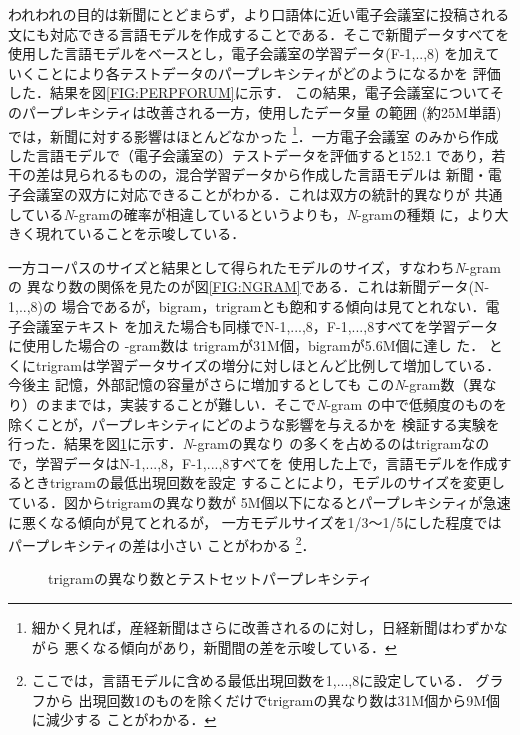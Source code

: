 \par
  われわれの目的は新聞にとどまらず，より口語体に近い電子会議室に投稿される
文にも対\mbox{応できる言語モデルを作成することである．}そこで新聞データすべてを
使用した言語モデルをベースとし，電子会議室の学習データ(F-1,..,8)
を加えていくことにより各テストデータのパープレキシティがどのようになるかを
評価した．結果を図\ref{FIG:PERPFORUM}に示す．
\mbox{この結果，電子会議室につい}\mbox{てそのパープレキシティは改善される一方，}使用したデータ量
の範囲 (約25M単語)では，新聞に対する影響はほとんどなかった
\footnote{細かく見れば，産経新聞はさらに改善されるのに対し，日経新聞はわずかながら
悪くなる傾向があり，新聞間の差を示唆している．}．一方電子会議室
\mbox{のみから作成した言語モデルで（電子会議}室の）テストデータを評価すると152.1
\mbox{であり，若干の差は見られるものの，混合学習データか}ら作成した言語モデルは
新聞・電子会議室の双方に対応できることがわかる．これは双方の統計的異なりが
共通している{\it N}-gramの確率が相違しているというよりも，{\it N}-gramの種類
に，より大きく現れていることを示唆している．
\par
一方コーパスのサイズと結果として得られたモデルのサイズ，すなわち{\it N}-gramの
異なり数\mbox{の関係を見たのが図\ref{FIG:NGRAM}である．}これは新聞データ(N-1,..,8)の
場合であるが，bigram，trigramとも飽和する傾向は見てとれない．電子会議室テキスト
を加えた場合も同様でN-1,...,8，F-1,...,8すべてを学習データに使用した場合の
\hspace{-0.1mm}{\it N}-gram\hspace{-0.1mm}数は
\hspace{-0.1mm}trigram\hspace{-0.1mm}が31M個，bigramが5.6M個に達し\break
た．
とくにtrigramは学習データサイズの増分に対しほとんど比例して増加している．
今後主\break
記憶，外部記憶の容量がさらに増加するとしても
この{\it N}-gram数（異なり）のままでは，実装することが難しい．そこで{\it N}-gram
の中で低頻度のものを除くことが，パープレキシティにどのような影響を与えるかを
検証する実験を行った．結果を図\ref{FIG:SMALLLM}に示す．{\it N}-gramの異なり
の多くを占めるのはtrigramなので，学習データはN-1,...,8，F-1,...,8すべてを
使用した上で，言語モデルを作成するとき\hspace{-0.1mm}trigram\hspace{-0.1mm}の最低出現回数を設定
することにより，\mbox{モデルのサイズを変更してい}る．図から\hspace{-0.05mm}trigram\hspace{-0.05mm}の異なり数が
\hspace{-0.05mm}5M\hspace{-0.05mm}個以下になるとパープレキシティが\mbox{急速に悪くなる傾向が}見てとれるが，
一方モデルサイズを1/3〜1/5にした程度ではパープレキシティの差は小さい
ことがわかる
\footnote{ここでは，言語モデルに含める最低出現回数を1,...,8に設定している．
グラフから
出現回数1のものを除くだけでtrigramの異なり数は31M個から9M個に減少する
ことがわかる．}．
\begin{figure}[htb]
\begin{center}
  \caption{trigramの異なり数とテストセットパープレキシティ}
  \label{FIG:SMALLLM}
\end{center}
\end{figure}
